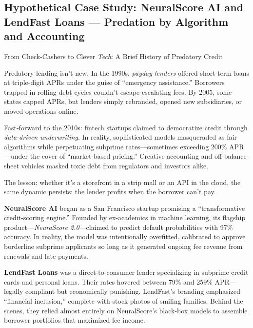 \subsection{Hypothetical Case Study: NeuralScore AI and LendFast Loans — Predation by Algorithm and Accounting}

\medskip

\begin{HistoricalSidebar}{From Check-Cashers to Clever \emph{Tech}: A Brief History of Predatory Credit}

Predatory lending isn’t new. In the 1990s, \emph{payday lenders} offered short-term loans at triple-digit APRs under the guise of “emergency assistance.” Borrowers trapped in rolling debt cycles couldn’t escape escalating fees. By 2005, some states capped APRs, but lenders simply rebranded, opened new subsidiaries, or moved operations online.

\medskip

Fast-forward to the 2010s: fintech startups claimed to democratize credit through \emph{data-driven underwriting}. In reality, sophisticated models masqueraded as fair algorithms while perpetuating subprime rates—sometimes exceeding 200\% APR—under the cover of “market-based pricing.” Creative accounting and off-balance-sheet vehicles masked toxic debt from regulators and investors alike.

\medskip

The lesson: whether it’s a storefront in a strip mall or an API in the cloud, the same dynamic persists: the lender profits when the borrower can’t pay.

\end{HistoricalSidebar}

\medskip

\textbf{NeuralScore AI} began as a San Francisco startup promising a “transformative credit-scoring engine.” Founded by ex-academics in machine learning, its flagship product—\emph{NeuraScore 2.0}—claimed to predict default probabilities with 97\% accuracy. In reality, the model was intentionally overfitted, calibrated to approve borderline subprime applicants so long as it generated ongoing fee revenue from renewals and late payments.

\medskip

\textbf{LendFast Loans} was a direct-to-consumer lender specializing in subprime credit cards and personal loans. Their rates hovered between 79\% and 259\% APR—legally compliant but economically punishing. LendFast’s branding emphasized “financial inclusion,” complete with stock photos of smiling families. Behind the scenes, they relied almost entirely on NeuralScore’s black-box models to assemble borrower portfolios that maximized fee income.

